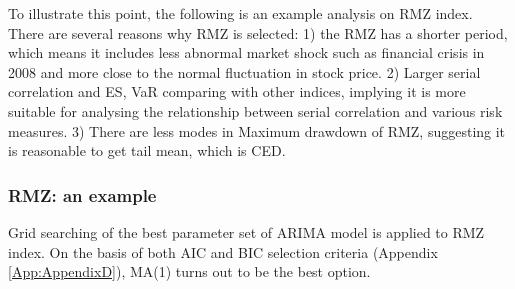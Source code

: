\documentclass[11pt]{article}
\begin{document}
To illustrate this point, the following is an example analysis on RMZ index. There are several reasons why RMZ is selected: 1) the RMZ has a shorter period, which means it includes less abnormal market shock such as financial crisis in 2008 and more close to the normal fluctuation in stock price. 2) Larger serial correlation and ES, VaR comparing with other indices, implying it is more suitable for analysing the relationship between serial correlation and various risk measures. 3) There are less modes in Maximum drawdown of RMZ, suggesting it is reasonable to get tail mean, which is CED.
\subsubsection{RMZ: an example}
Grid searching of the best parameter set of ARIMA model is applied to RMZ index. On the basis of both AIC and BIC selection criteria (Appendix \ref{App:AppendixD}), MA(1) turns out to be the best option.
\end{document}

